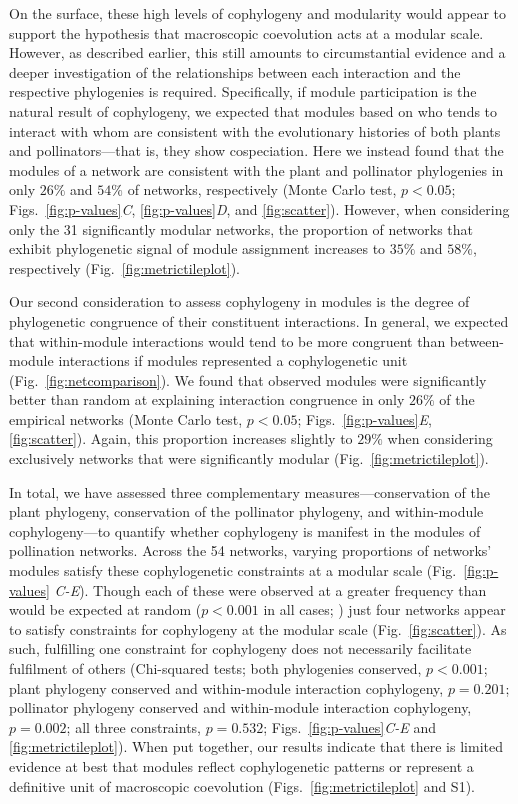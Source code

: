 \documentclass{article}
\begin{document}
	On the surface, these high levels of cophylogeny and modularity would appear to support the hypothesis that macroscopic coevolution acts at a modular scale. However, as described earlier, this still amounts to circumstantial evidence and a deeper investigation of the relationships between each interaction and the respective phylogenies is required. Specifically, if module participation is the natural result of cophylogeny, we expected that modules based on who tends to interact with whom are consistent with the evolutionary histories of both plants and pollinators---that is, they show cospeciation. Here we instead found that the modules of a network are consistent with the plant and pollinator phylogenies in only $26\%$ and $54\%$ of networks, respectively (Monte Carlo test, $p<0.05$; Figs.\ \ref{fig:p-values}\emph{C}, \ref{fig:p-values}\emph{D}, and \ref{fig:scatter}). However, when considering only the 31 significantly modular networks, the proportion of networks that exhibit phylogenetic signal of module assignment increases to $35\%$ and $58\%$, respectively (Fig.\ \ref{fig:metrictileplot}).%
	
	Our second consideration to assess cophylogeny in modules is the degree of phylogenetic congruence of their constituent interactions. In general, we expected that within-module interactions would tend to be more congruent than between-module interactions if modules represented a cophylogenetic unit (Fig.\ \ref{fig:netcomparison}). We found that observed modules were significantly better than random at explaining interaction congruence in only $26\%$ of the empirical networks (Monte Carlo test, $p<0.05$; Figs.\ \ref{fig:p-values}\emph{E}, \ref{fig:scatter}). Again, this proportion increases slightly to $29\%$ when considering exclusively networks that were significantly modular (Fig.\ \ref{fig:metrictileplot}).%
	
	In total, we have assessed three complementary measures---conservation of the plant phylogeny, conservation of the pollinator phylogeny, and within-module cophylogeny---to quantify whether cophylogeny is manifest in the modules of pollination networks. Across the 54 networks, varying proportions of networks' modules satisfy these cophylogenetic constraints at a modular scale (Fig.\ \ref{fig:p-values} \emph{C-E}). Though each of these were observed at a greater frequency than would be expected at random ($p < 0.001$ in all cases; \citep{Moran2003}) just four networks appear to satisfy constraints for cophylogeny at the modular scale (Fig.\ \ref{fig:scatter}). As such, fulfilling one constraint for cophylogeny does not necessarily facilitate fulfilment of others (Chi-squared tests; both phylogenies conserved, $p<0.001$; plant phylogeny conserved and within-module interaction cophylogeny, $p=0.201$; pollinator phylogeny conserved and within-module interaction cophylogeny, $p=0.002$; all three constraints, $p=0.532$; Figs.\ \ref{fig:p-values}\emph{C-E} and \ref{fig:metrictileplot}). When put together, our results indicate that there is limited evidence at best that modules reflect cophylogenetic patterns or represent a definitive unit of macroscopic coevolution (Figs.\ \ref{fig:metrictileplot} and S1).
	
\end{document}

